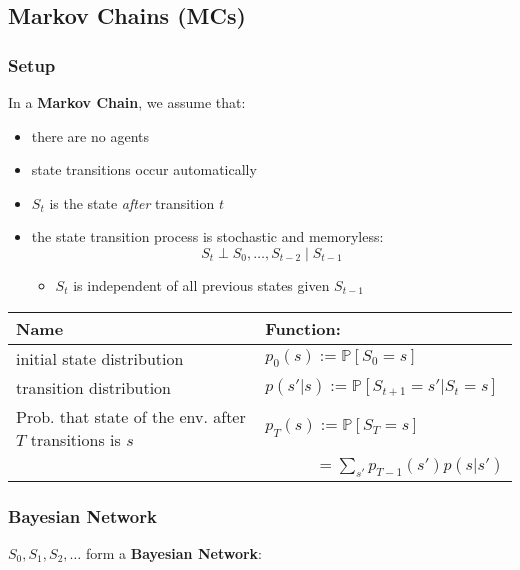 \subsection{Markov Chains (MCs)}

\subsubsection{Setup}
\begin{summary}
    In a \textbf{Markov Chain}, we assume that:
    \begin{itemize}
        \item there are no agents
        \item state transitions occur automatically
        \item $S_t$ is the state \textit{after} transition $t$
        \item the state transition process is stochastic and memoryless:
        \[
        S_t \perp S_0, \dots, S_{t-2} \mid S_{t-1}
        \]
        \begin{itemize}
            \item $S_t$ is independent of all previous states given $S_{t-1}$
        \end{itemize}
    \end{itemize}
    \vspace{1em}

    \begin{center}
        \begin{tabular}{ll}
            \toprule
            \textbf{Name} & \textbf{Function:} \\
            \midrule
            initial state distribution & $p_0(s) := \mathbb{P}[S_0 = s]$ \\
            \midrule
            transition distribution & $p(s'|s) := \mathbb{P}[S_{t+1} = s' | S_t = s]$ \\
            \midrule 
            Prob. that state of the env. after $T$ transitions is $s$ & $p_T(s) := \mathbb{P}[S_T = s]$ \\
            & $\quad \quad \; \; \; \;= \sum_{s'} p_{T-1}(s') p(s|s')$ \\
            \bottomrule            
        \end{tabular}
    \end{center}
\end{summary}

\subsubsection{Bayesian Network}
\begin{definition}
    $S_0,S_1,S_2,\ldots$ form a \textbf{Bayesian Network}:
\end{definition}
\newpage

